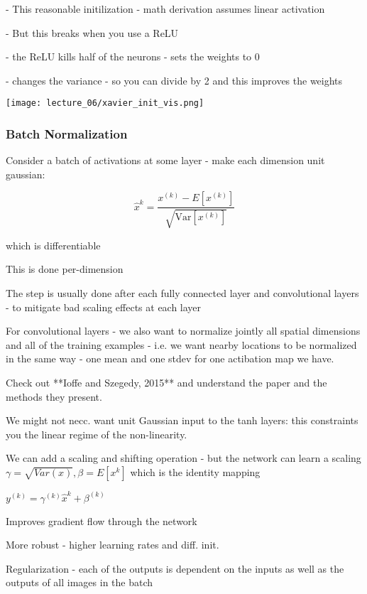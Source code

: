  - This reasonable initilization - math derivation assumes linear activation

 - But this breaks when you use a ReLU
   	
   	- the ReLU kills half of the neurons - sets the weights to 0 
    
   - changes the variance - so you can divide by 2 and this improves the weights

    \texttt{[image: lecture\_06/xavier\_init\_vis.png]}

\subsubsection{Batch Normalization}

Consider a batch of activations at  some layer - make each dimension unit gaussian:

$$\hat x^k = \frac{x^{(k)} - E[x^{(k)}] }{\sqrt{\text{Var}[x^(k)]}} $$

which is differentiable

This is done per-dimension

The step is usually done after each fully connected layer and convolutional layers - to mitigate bad scaling effects at each layer

For convolutional layers - we also want to normalize jointly all spatial dimensions and all of the training examples - i.e. we want nearby locations to be normalized in the same way - one mean and one stdev for one actibation map we have. 

Check out **Ioffe and Szegedy, 2015** and understand the paper and the methods they present. 

We might not necc. want unit Gaussian input to the tanh layers: this constraints you the linear regime of the non-linearity.



We can add a scaling and shifting operation - but the network can learn a scaling $\gamma = \sqrt{Var(x)}, \beta = E[x^k]$ which is the identity mapping

$y^{(k)} = \gamma^{(k)}\hat{x}^k + \beta^{(k)} $

Improves gradient flow through the network 

More robust - higher learning rates and diff. init.

Regularization - each of the outputs is dependent on the inputs as well as the outputs of all images in the batch



